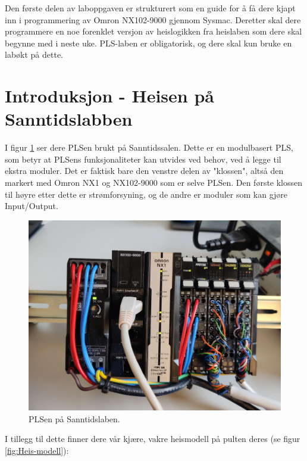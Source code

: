 \begin{alphasection}
Den første delen av laboppgaven er strukturert som en guide for å få dere kjapt inn i programmering av Omron NX102-9000 gjennom Sysmac. Deretter skal dere programmere en noe forenklet versjon av heislogikken fra heislaben som dere skal begynne med i neste uke. PLS-laben er obligatorisk, og dere skal kun bruke en labøkt på dette.

\section{Introduksjon - Heisen på Sanntidslabben}\label{sec:1-intro}
I figur \ref{fig:omron-pls} ser dere PLSen brukt på Sanntidssalen. Dette er en modulbasert PLS, som betyr at PLSens funksjonaliteter kan utvides ved behov, ved å legge til ekstra moduler. Det er faktisk bare den venstre delen av "klossen", altså den markert med Omron NX1 og NX102-9000 som er selve PLSen. Den første klossen til høyre etter dette er strømforsyning, og de andre er moduler som kan gjøre Input/Output. 

\begin{figure}[ht]
    \centering
    \includegraphics[scale=0.1]{figures/omron-pls.jpg}
    \caption{PLSen på Sanntidslaben.}
    \label{fig:omron-pls}
\end{figure}

I tillegg til dette finner dere vår kjære, vakre heismodell på pulten deres (se figur \ref{fig:Heis-modell}):



\end{alphasection}
